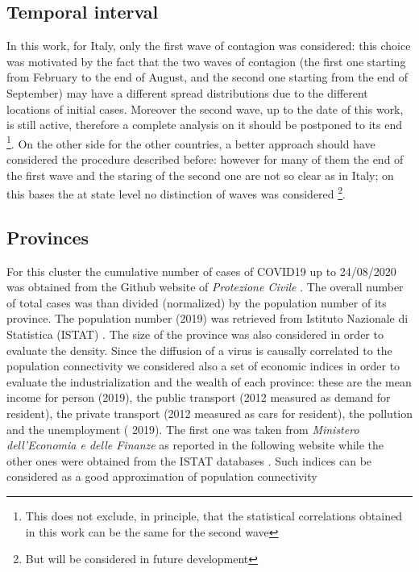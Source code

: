 \documentclass[
12pt, %
a4paper, %
oneside, %
headinclude,footinclude, %
BCOR5mm, %
]{scrartcl}
\begin{document}
\subsection{Temporal interval}

In this work, for Italy, only the first wave of contagion was considered: this choice was motivated by the fact that the two waves of contagion (the first one starting from February to the end of August, and the second one starting from the end of September) may have a different spread distributions due to the different locations of initial cases. Moreover the second wave, up to the date of this work, is still active, therefore a complete analysis on it should be postponed to its end \footnote{This does not exclude, in principle, that the statistical correlations obtained in this work can be the same for the second wave}. On the other side for the other countries, a better approach should have considered the procedure described before: however for many of them the end of the first wave and the staring of the second one are not so clear as in Italy; on this bases the at state level no distinction of waves was considered \footnote{But will be considered in future development}.   


\subsection{Provinces} 
For this cluster the cumulative number of cases of COVID19 up to 24/08/2020 was obtained from the Github website of \textit{Protezione Civile} \cite{github-protezionecivile} . The overall number of total cases was than divided (normalized) by the population number of its province. The population number (2019) was retrieved from Istituto Nazionale di Statistica (ISTAT) \cite{ISTAT}. The size of the province was also considered in order to evaluate the density. Since the diffusion of a virus is causally correlated to the population connectivity \cite{lloyd2001viruses,kraemer2020effect} we considered also a set of economic indices in order to evaluate the industrialization and the wealth of each province: these are the mean income for person (2019), the public transport (2012 measured as demand for resident), the private transport (2012 measured as cars for resident), the pollution and the unemployment ( 2019). The first one was taken from \textit{Ministero dell'Economia e delle Finanze} as reported in the following website \cite{MEF} while the other ones were obtained from the ISTAT databases \cite{ISTAT}. Such indices can be considered as a good approximation of population connectivity 
\end{document}
